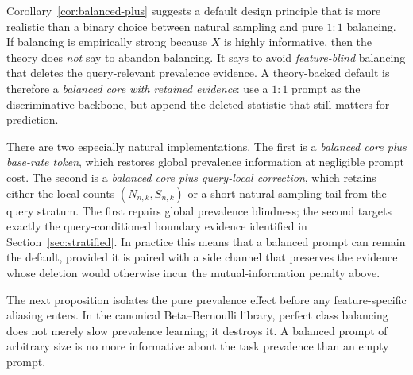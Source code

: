 \documentclass{article}
\theoremstyle{definition}
\theoremstyle{remark}
\begin{document}
Corollary~\ref{cor:balanced-plus} suggests a default design principle that is more realistic than a binary choice between natural sampling and pure $1{:}1$ balancing. If balancing is empirically strong because $X$ is highly informative, then the theory does \emph{not} say to abandon balancing. It says to avoid \emph{feature-blind} balancing that deletes the query-relevant prevalence evidence. A theory-backed default is therefore a \emph{balanced core with retained evidence}: use a $1{:}1$ prompt as the discriminative backbone, but append the deleted statistic that still matters for prediction.

There are two especially natural implementations. The first is a \emph{balanced core plus base-rate token}, which restores global prevalence information at negligible prompt cost. The second is a \emph{balanced core plus query-local correction}, which retains either the local counts $(N_{n,k},S_{n,k})$ or a short natural-sampling tail from the query stratum. The first repairs global prevalence blindness; the second targets exactly the query-conditioned boundary evidence identified in Section~\ref{sec:stratified}. In practice this means that a balanced prompt can remain the default, provided it is paired with a side channel that preserves the evidence whose deletion would otherwise incur the mutual-information penalty above.

The next proposition isolates the pure prevalence effect before any feature-specific aliasing enters. In the canonical Beta--Bernoulli library, perfect class balancing does not merely slow prevalence learning; it destroys it. A balanced prompt of arbitrary size is no more informative about the task prevalence than an empty prompt.
\end{document}
